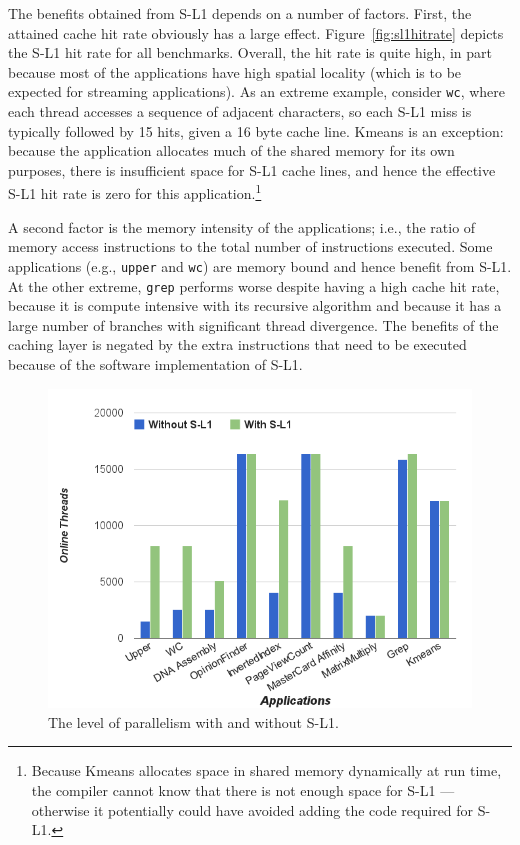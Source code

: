The benefits obtained from S-L1 depends on a number of factors.
First, the attained cache hit rate obviously has a large effect.
Figure~\ref{fig:sl1hitrate} depicts the S-L1 hit rate for all benchmarks. 
Overall, the hit rate is quite high, in part because most of the applications have high spatial
locality (which is to be expected for streaming applications). 
As an extreme example, consider \texttt{wc}, where each thread accesses a sequence of adjacent characters, so each S-L1 miss is typically followed by 15 hits, given a 16 byte cache line.
Kmeans is an exception: because the application allocates much of the shared memory for its own purposes, there is insufficient space for S-L1 cache lines, and hence the effective S-L1 hit rate is zero for this application.\footnote{
	Because Kmeans allocates space in shared memory dynamically at run time,
	the compiler cannot know that there is not enough space for S-L1 ---
	otherwise it potentially could have avoided adding the code required for S-L1.}

A second factor is the memory intensity of the applications; i.e., the ratio of memory access instructions to the total number of instructions executed.
Some applications (e.g., \texttt{upper} and \texttt{wc}) are memory bound and hence benefit from S-L1.
At the other extreme, \texttt{grep} performs worse despite having a high cache hit rate,
because it is compute intensive with its recursive algorithm and because it has a large number of branches with significant thread divergence.
The benefits of the caching layer is negated by the extra instructions that need to be executed because of the software implementation of S-L1.


\begin{figure}[t]
\includegraphics[scale=0.27]{8higherParallelism.png}
\caption{The level of parallelism with and without S-L1.}
\label{fig:levelprallelism}
\end{figure}

